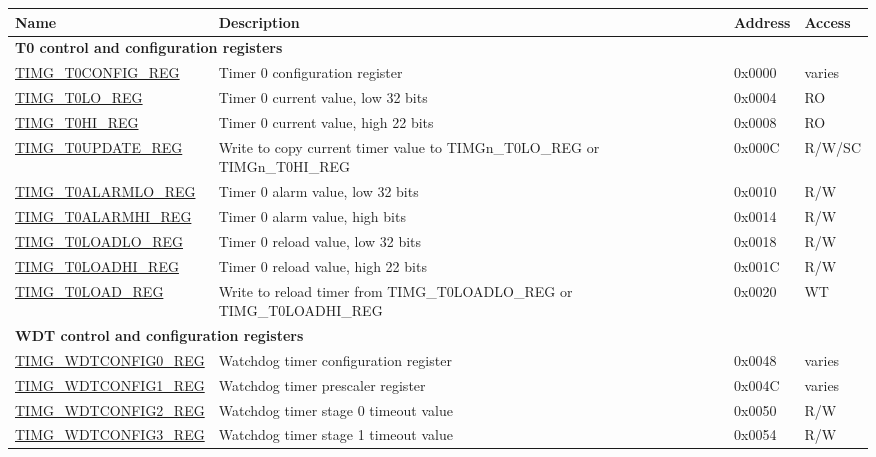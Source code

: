 \begin{longtable}{ | p{6cm} | p{7.2cm} | p{1.3cm} | p{1.5cm} | }
\hline\rowcolor{lightgray}
Name & Description &  Address & Access \\ \hline
\endhead
\multicolumn{4}{|l|}{\textbf{T0 control and configuration registers}} \\ \hline
\hyperref[regdesc:TIMGTXCONFIGREG]{TIMG\_T0CONFIG\_REG} & Timer 0 configuration register & 0x0000 & varies \\ \hline
\hyperref[regdesc:TIMGTXLOREG]{TIMG\_T0LO\_REG} & Timer 0 current value, low 32 bits & 0x0004 & RO \\ \hline
\hyperref[regdesc:TIMGTXHIREG]{TIMG\_T0HI\_REG} & Timer 0 current value, high 22 bits & 0x0008 & RO \\ \hline
\hyperref[regdesc:TIMGTXUPDATEREG]{TIMG\_T0UPDATE\_REG} & Write to copy current timer value to TIMGn\_T0LO\_REG or TIMGn\_T0HI\_REG  & 0x000C & R/W/SC \\ \hline
\hyperref[regdesc:TIMGTXALARMLOREG]{TIMG\_T0ALARMLO\_REG} & Timer 0 alarm value, low 32 bits & 0x0010 & R/W \\ \hline
\hyperref[regdesc:TIMGTXALARMHIREG]{TIMG\_T0ALARMHI\_REG} & Timer 0 alarm value, high bits & 0x0014 & R/W \\ \hline
\hyperref[regdesc:TIMGTXLOADLOREG]{TIMG\_T0LOADLO\_REG} & Timer 0 reload value, low 32 bits & 0x0018 & R/W \\ \hline
\hyperref[regdesc:TIMGTXLOADHIREG]{TIMG\_T0LOADHI\_REG} & Timer 0 reload value, high 22 bits & 0x001C & R/W \\ \hline
\hyperref[regdesc:TIMGTXLOADREG]{TIMG\_T0LOAD\_REG} & Write to reload timer from TIMG\_T0LOADLO\_REG or TIMG\_T0LOADHI\_REG & 0x0020 & WT \\ \hline
\multicolumn{4}{|l|}{\textbf{WDT control and configuration registers}} \\ \hline
\hyperref[regdesc:TIMGWDTCONFIG0REG]{TIMG\_WDTCONFIG0\_REG} & Watchdog timer configuration register & 0x0048 & varies \\ \hline
\hyperref[regdesc:TIMGWDTCONFIG1REG]{TIMG\_WDTCONFIG1\_REG} & Watchdog timer prescaler register & 0x004C & varies \\ \hline
\hyperref[regdesc:TIMGWDTCONFIG2REG]{TIMG\_WDTCONFIG2\_REG} & Watchdog timer stage 0 timeout value & 0x0050 & R/W \\ \hline
\hyperref[regdesc:TIMGWDTCONFIG3REG]{TIMG\_WDTCONFIG3\_REG} & Watchdog timer stage 1 timeout value & 0x0054 & R/W \\ \hline

\end{longtable}
